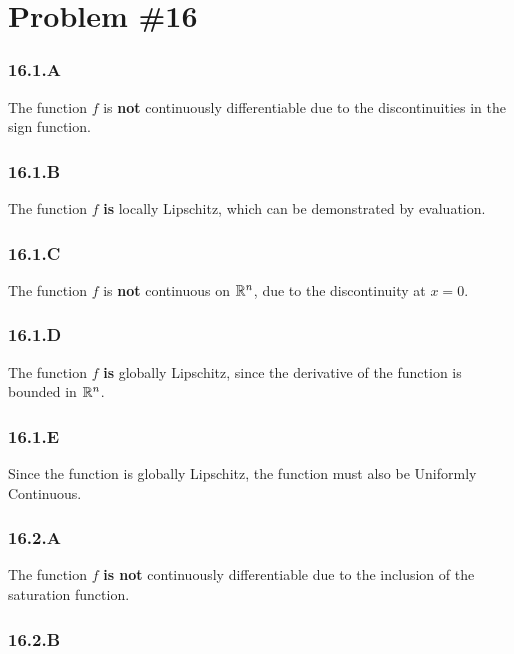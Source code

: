 






\section*{Problem \#16}

\subsubsection*{16.1.A}

The function $f$ is \textbf{not} continuously differentiable due to the discontinuities in the sign function.
\subsubsection*{16.1.B}

The function $f$ \textbf{is} locally Lipschitz, which can be demonstrated by evaluation.
\subsubsection*{16.1.C}

The function $f$ is \textbf{not} continuous on $\mathbb{R}^n$, due to the discontinuity at $x =0$.
\subsubsection*{16.1.D}

The function $f$ \textbf{is} globally Lipschitz, since the derivative of the function is bounded in $\mathbb{R}^n$.
\subsubsection*{16.1.E}

Since the function is globally Lipschitz, the function must also be Uniformly Continuous.

\subsubsection*{16.2.A}

The function $f$ \textbf{is not} continuously differentiable due to the inclusion of the saturation function.

\subsubsection*{16.2.B}

